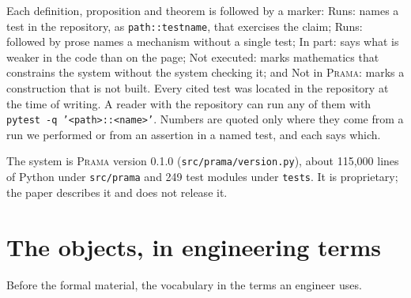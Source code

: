 \documentclass[11pt,a4paper]{article}
\renewcommand{\_}{\oldunderscore\allowbreak}
\theoremstyle{plain}
\theoremstyle{definition}
\theoremstyle{remark}
\begin{document}
Each definition, proposition and theorem is followed by a marker:
\textsf{Runs:} names a test in the repository, as \texttt{path::test\_name}, that exercises the claim;
\textsf{Runs:} followed by prose names a mechanism without a single test;
\textsf{In part:} says what is weaker in the code than on the page;
\textsf{Not executed:} marks mathematics that constrains the system without the system checking it; and
\textsf{Not in \textsc{Prama}:} marks a construction that is not built. Every cited test was located in
the repository at the time of writing. A reader with the repository can run any of them with
\texttt{pytest -q '<path>::<name>'}. Numbers are quoted only where they come from a run we performed or from
an assertion in a named test, and each says which.

The system is \textsc{Prama} version 0.1.0 (\texttt{src/prama/version.py}), about 115,000 lines of Python
under \texttt{src/prama} and 249 test modules under \texttt{tests}. It is proprietary; the paper describes
it and does not release it.

\section{The objects, in engineering terms}\label{sec:objects}

Before the formal material, the vocabulary in the terms an engineer uses.
\end{document}
